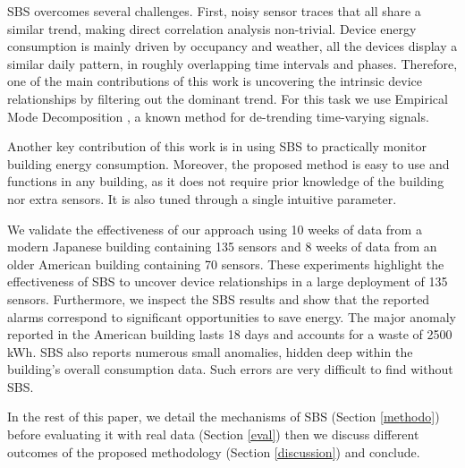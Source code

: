 SBS overcomes several challenges.  First, 
noisy sensor traces that all share a similar trend, making direct correlation analysis non-trivial.
Device energy consumption is mainly driven by occupancy and weather, all the devices display a similar daily pattern, in 
roughly overlapping time intervals and phases.
Therefore, one of the main contributions of this work is uncovering the intrinsic device relationships by filtering out the 
dominant trend.  For this task we use 
Empirical Mode Decomposition \cite{huang:emd1998}, a known method for de-trending time-varying signals.

Another key contribution of this work is in using SBS to practically monitor building energy consumption.
Moreover, the proposed method is easy to use and functions in any building, as it does not require prior knowledge of the building nor extra sensors.  
It is also tuned through a single intuitive parameter.  %

We validate the effectiveness of our approach using 10 weeks of data from a modern Japanese building containing 135 sensors and 
8 weeks of data from an older American building containing 70 sensors.
These experiments highlight the effectiveness of SBS to uncover device relationships in a large deployment of 135 sensors.
Furthermore, we inspect the SBS results and show that the reported alarms correspond to significant opportunities to save energy.
The major anomaly reported in the American building lasts 18 days and accounts for a waste of 2500 kWh. %
SBS also reports numerous small anomalies, hidden deep within the building's overall consumption data.  Such errors are very difficult to find
without SBS.

In the rest of this paper, we detail the mechanisms of SBS (Section \ref{methodo}) before evaluating it with real data (Section \ref{eval}) then we discuss different outcomes of the proposed methodology (Section \ref{discussion}) and conclude.
